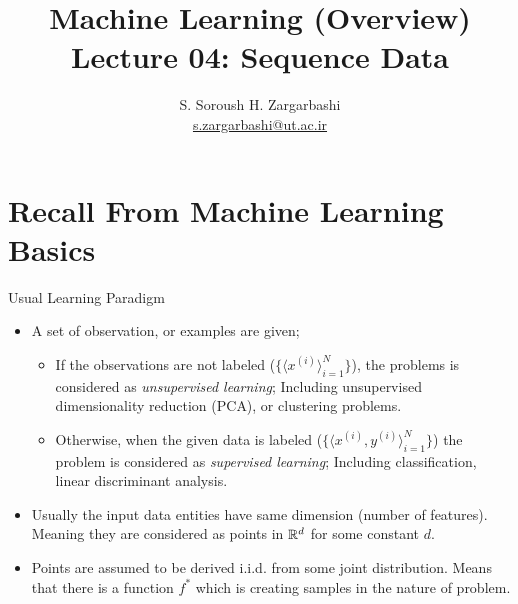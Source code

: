 \documentclass{beamer}
\title[ML: Data and Dimension]{\normalsize{Machine Learning (Overview)}\\\vspace{10pt} \small{Lecture 04:} \Large{Sequence Data}}
\author[Soroush Zargar]{S. Soroush H. Zargarbashi\\ \tiny{\href{mailto:s.zargarbashi@ut.ac.ir}{s.zargarbashi@ut.ac.ir}}}
\institute{University of Tehran \\}
\newcommand{\R}{\Bbb{R}}
\begin{document}
\maketitle

\section{Recall From Machine Learning Basics}

	\begin{frame}{Usual Learning Paradigm}
		\begin{itemize}
			\item<1-> A set of observation, or examples are given;
			\begin{itemize}
				\item<2-> If the observations are not labeled ($\{ \langle x^{(i)} \rangle_{i = 1}^{N} \}$), the problems is considered as \alert{\textit{unsupervised learning}}; Including unsupervised dimensionality reduction (PCA), or clustering problems.
				\item<3-> Otherwise, when the given data is labeled ($\{ \langle x^{(i)},y^{(i)} \rangle_{i = 1}^{N} \}$) the problem is considered as \alert{\textit{supervised learning}}; Including classification, linear discriminant analysis. 
			\end{itemize}
			\item<4-> Usually the input data entities have same dimension (number of features). Meaning they are considered as points in $\R^d$ for some constant $d$.
			\item<5-> Points are assumed to be derived i.i.d. from some joint distribution. Means that there is a function $f^*$ which is creating samples in the nature of problem. 
		\end{itemize}
	\end{frame}
\end{document}
